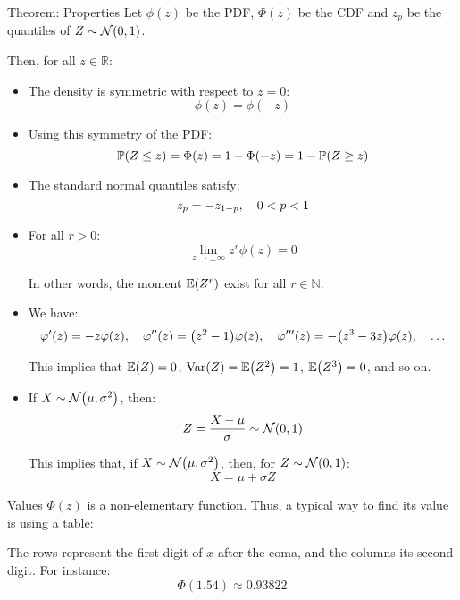 \documentclass[a4paper]{article}
\begin{document}
\begin{parag}{Theorem: Properties}
    Let $\phi\left(z\right)$ be the PDF, $\Phi\left(z\right)$ be the CDF and $z_p$ be the quantiles of $Z \followsdistr \mathcal{N}\left(0, 1\right)$.

    Then, for all $z \in \mathbb{R}$:
    \begin{itemize}
        \item The density is symmetric with respect to $z=0$: 
        \[\phi\left(z\right) = \phi\left(-z\right)\]
        \item Using this symmetry of the PDF:
        \[\prob\left(Z \leq z\right) = \Phi\left(z\right) = 1 - \Phi\left(-z\right) = 1 - \prob\left(Z \geq z\right)\]
        \item The standard normal quantiles satisfy: 
        \[z_p = -z_{1 - p}, \quad 0 < p < 1\]
        \item For all $r > 0$: 
        \[\lim_{z \to \pm\infty} z^r \phi\left(z\right) = 0\]
        
        In other words, the moment $\exval\left(Z^r\right)$ exist for all $r \in \mathbb{N}$.
        \item We have: 
        \[\phi'\left(z\right) = -z \phi\left(z\right), \mathspace \phi''\left(z\right) = \left(z^2 - 1\right)\phi\left(z\right), \mathspace \phi'''\left(z\right) = -\left(z^3 - 3z\right)\phi\left(z\right), \mathspace \ldots\]
        
        This implies that $\exval\left(Z\right) = 0$, $\Var\left(Z\right) = \exval\left(Z^2\right) = 1$, $\exval\left(Z^3\right) = 0$, and so on.
        \item If $X \followsdistr \mathcal{N}\left(\mu, \sigma ^2\right)$, then: 
        \[Z = \frac{X - \mu}{\sigma} \followsdistr \mathcal{N}\left(0, 1\right)\]
        
        This implies that, if $X \followsdistr \mathcal{N}\left(\mu, \sigma ^2\right)$, then, for $Z \followsdistr \mathcal{N}\left(0, 1\right)$: 
        \[X = \mu + \sigma Z\]
    \end{itemize}
\end{parag}

\begin{parag}{Values}
    $\Phi\left(z\right)$ is a non-elementary function. Thus, a typical way to find its value is using a table:

    The rows represent the first digit of $x$ after the coma, and the columns its second digit. For instance: 
    \[\Phi\left(1.54\right) \approx 0.93822\]
\end{parag}
\end{document}
